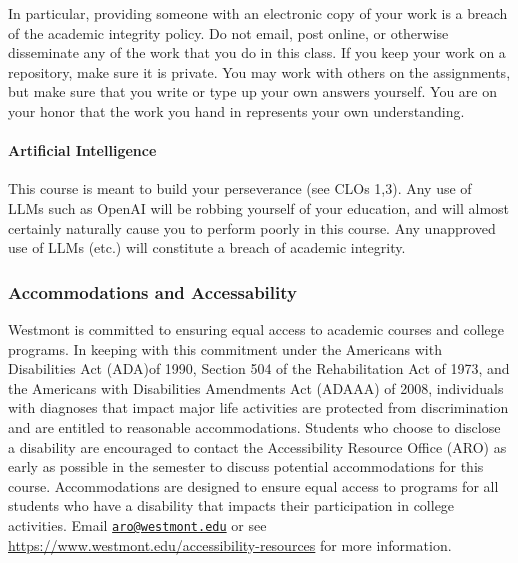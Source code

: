 \documentclass[
  twoside]{article}
\begin{document}
In particular, providing someone with an electronic copy of your work is
a breach of the academic integrity policy. Do not email, post online, or
otherwise disseminate any of the work that you do in this class. If you
keep your work on a repository, make sure it is private. You may work
with others on the assignments, but make sure that you write or type up
your own answers yourself. You are on your honor that the work you hand
in represents your own understanding.

\paragraph{Artificial Intelligence}\label{artificial-intelligence}

This course is meant to build your perseverance (see CLOs 1,3). Any use
of LLMs such as OpenAI will be robbing yourself of your education, and
will almost certainly naturally cause you to perform poorly in this
course. Any unapproved use of LLMs (etc.) will constitute a breach of
academic integrity.

\subsubsection{Accommodations and
Accessability}\label{accommodations-and-accessability}

Westmont is committed to ensuring equal access to academic courses and
college programs. In keeping with this commitment under the Americans
with Disabilities Act (ADA)of 1990, Section 504 of the Rehabilitation
Act of 1973, and the Americans with Disabilities Amendments Act (ADAAA)
of 2008, individuals with diagnoses that impact major life activities
are protected from discrimination and are entitled to reasonable
accommodations. Students who choose to disclose a disability are
encouraged to contact the Accessibility Resource Office (ARO) as early
as possible in the semester to discuss potential accommodations for this
course. Accommodations are designed to ensure equal access to programs
for all students who have a disability that impacts their participation
in college activities. Email
\href{mailto:aro@westmont.edu}{\nolinkurl{aro@westmont.edu}} or see
\url{https://www.westmont.edu/accessibility-resources} for more
information.
\end{document}
